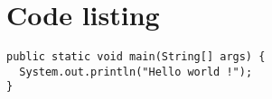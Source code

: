 \section{Code listing} %
\label{sec:code_listing}

\begin{lstlisting}[caption=Hello World, label=hello_world]
public static void main(String[] args) {
  System.out.println("Hello world !");
}
\end{lstlisting}

